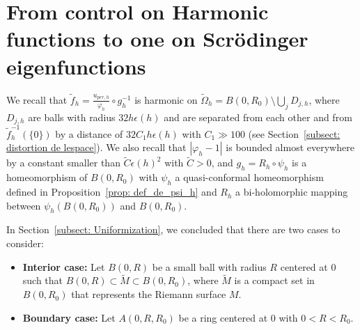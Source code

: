 \documentclass[leqno,11pt,letterpaper, english]{amsart}
\theoremstyle{plain}
\theoremstyle{definition}
\numberwithin{equation}{section}
\begin{document}
\section{From control on Harmonic functions to one on Scrödinger eigenfunctions}
\label{sect: Ineg Carleman}
We recall that
$\tilde{f}_h = \frac{u_{per,h}}{\varphi_h} \circ g_h^{-1}$
is harmonic on $\tilde{\Omega}_h = B(0, R_0) \setminus \bigcup_{j} D_{j,h}$, where $D_{j,h}$ are balls with radius $32h\epsilon(h)$ and are separated from each other and from $\tilde{f}_h^{-1}(\{0\})$ by a distance of $32C_1 h\epsilon(h)$ with $C_1 \gg 100$ (see Section~\ref{subsect: distortion de lespace}). We also recall that $|\varphi_h - 1|$ is bounded almost everywhere by a constant smaller than $\tilde{C}\epsilon(h)^2$ with $\tilde{C} > 0$, and $g_h = R_h \circ \psi_h$ is a homeomorphism of $B(0, R_0)$ with $\psi_h$ a quasi-conformal homeomorphism defined in Proposition~\ref{prop: def_de_psi_h} and $R_h$ a bi-holomorphic mapping between $\psi_h(B(0, R_0))$ and $B(0, R_0)$.

In Section~\ref{subsect: Uniformization}, we concluded that there are two cases to consider:
\begin{itemize}
    \item \textbf{Interior case:} Let $B(0, R)$ be a small ball with radius $R$ centered at $0$ such that $B(0, R) \subset \tilde{M} \subset B(0, R_0)$, where $\tilde{M}$ is a compact set in $B(0, R_0)$ that represents the Riemann surface $M$.
    \item \textbf{Boundary case:} Let $ A(0, R, R_0)$ be a ring centered at $0$ with $0 < R < R_0$.
\end{itemize}

\end{document}
